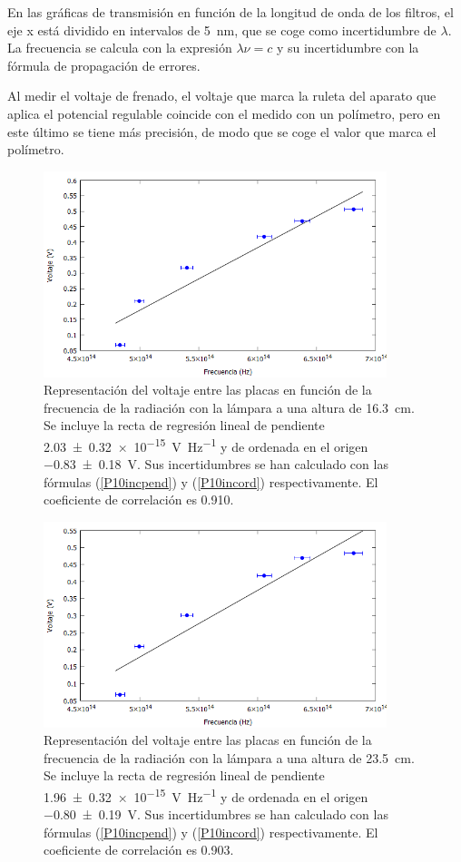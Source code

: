 \documentclass[12pt]{article}
\numberwithin{table}{section}
\numberwithin{figure}{section}
\numberwithin{equation}{section}
\newcommand{\data}[3]{\SI{#1 \pm #2}{#3}}
\begin{document}
En las gráficas de transmisión en función de la longitud de onda de los filtros, el eje x está dividido en intervalos de \SI{5}{nm}, que se coge como incertidumbre de $\lambda$. La frecuencia se calcula con la expresión $\lambda\nu=c$ y su incertidumbre con la fórmula de propagación de errores.

Al medir el voltaje de frenado, el voltaje que marca la ruleta del aparato que aplica el potencial regulable coincide con el medido con un polímetro, pero en este último se tiene más precisión, de modo que se coge el valor que marca el polímetro.
\begin{figure}[!ht]
	\begin{center}
		\includegraphics[width=10cm]{P1016,3cm.png}
		\caption{Representación del voltaje entre las placas en función de la frecuencia de la radiación con la lámpara a una altura de \SI{16.3}{cm}. Se incluye la recta de regresión lineal de pendiente \data{2.03}{0.32e-15}{V Hz^{-1}} y de ordenada en el origen \data{-0.83}{0.18}{V}. Sus incertidumbres se han calculado con las fórmulas (\ref{P10incpend}) y (\ref{P10incord}) respectivamente. El coeficiente de correlación es \num{0.910}.}
		\label{P1016,3cm}
	\end{center}
\end{figure}
\begin{figure}[!ht]
	\begin{center}
		\includegraphics[width=10cm]{P1023,5cm.png}
		\caption{Representación del voltaje entre las placas en función de la frecuencia de la radiación con la lámpara a una altura de \SI{23.5}{cm}. Se incluye la recta de regresión lineal de pendiente \data{1.96}{0.32e-15}{V Hz^{-1}} y de ordenada en el origen \data{-0.80}{0.19}{V}. Sus incertidumbres se han calculado con las fórmulas (\ref{P10incpend}) y (\ref{P10incord}) respectivamente. El coeficiente de correlación es \num{0.903}.}
		\label{P1023,5cm}
	\end{center}
\end{figure}
\end{document}
